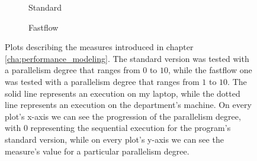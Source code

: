 \begin{figure}
        \begin{subfigure}{0.33\textwidth}
            \caption{Standard}
            \label{fig:efficiency_standard}
        \end{subfigure}
        \begin{subfigure}{0.33\textwidth}
            \caption{Fastflow}
            \label{fig:efficiency_fastflow}
        \end{subfigure}
        \caption{Plots describing the measures introduced in chapter \ref{cha:performance_modeling}. The standard
        version was tested with a parallelism degree that ranges from $0$ to $10$, while the fastflow one was
        tested with a parallelism degree that ranges from $1$ to $10$. The solid line represents an execution
        on my laptop, while the dotted line represents an execution on the department's machine. On every
        plot's x-axis we can see the progression of the parallelism degree, with $0$ representing
        the sequential execution for the program's standard version, while on every plot's
        y-axis we can see the measure's value for a particular parallelism degree.}
        \label{fig:performances}
    \end{figure}
    \newpage
    \setcounter{page}{2}
